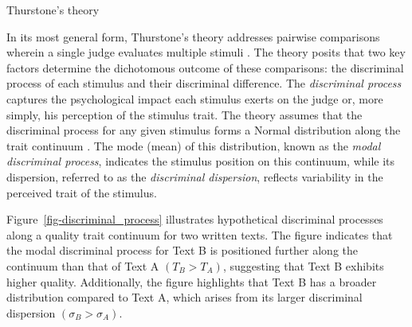 \documentclass[
  authoryear,
  review,
  1p]{elsarticle}
\begin{document}
Thurstone's theory

In its most general form, Thurstone's theory addresses pairwise
comparisons wherein a single judge evaluates multiple stimuli
\citep[pp.~267]{Thurstone_1927b}. The theory posits that two key factors
determine the dichotomous outcome of these comparisons: the discriminal
process of each stimulus and their discriminal difference. The
\emph{discriminal process} captures the psychological impact each
stimulus exerts on the judge or, more simply, his perception of the
stimulus trait. The theory assumes that the discriminal process for any
given stimulus forms a Normal distribution along the trait continuum
\citep[pp.~266]{Thurstone_1927b}. The mode (mean) of this distribution,
known as the \emph{modal discriminal process}, indicates the stimulus
position on this continuum, while its dispersion, referred to as the
\emph{discriminal dispersion}, reflects variability in the perceived
trait of the stimulus.

Figure~\ref{fig-discriminal_process} illustrates hypothetical
discriminal processes along a quality trait continuum for two written
texts. The figure indicates that the modal discriminal process for Text
B is positioned further along the continuum than that of Text A
\((T_{B} > T_{A})\), suggesting that Text B exhibits higher quality.
Additionally, the figure highlights that Text B has a broader
distribution compared to Text A, which arises from its larger
discriminal dispersion \((\sigma_{B} > \sigma_{A})\).
\end{document}
